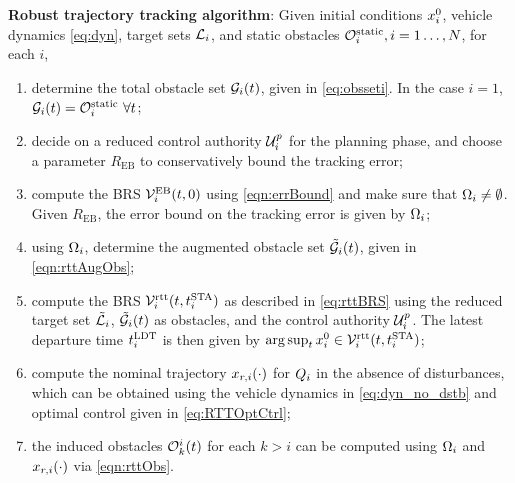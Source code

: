 \begin{alg}
\label{alg:rtt}
\textbf{Robust trajectory tracking algorithm}: Given initial conditions $x_i^0$, vehicle dynamics \eqref{eq:dyn}, target sets $\mathcal{L}_i$, and static obstacles $\mathcal{O}^\text{static}_i, i = 1\ldots, N$, for each $i$,
\begin{enumerate}[leftmargin = 0.5cm]
\item determine the total obstacle set $\mathcal{G}_i(t)$, given in \eqref{eq:obsseti}. In the case $i=1$, $\mathcal{G}_i(t) = \mathcal{O}^\text{static}_i ~ \forall t$;
\item decide on a reduced control authority $\mathcal{U}^p_i$ for the planning phase, and choose a parameter $R_{\text{EB}}$ to conservatively bound the tracking error;
\item compute the BRS $\mathcal{V}^{\text{EB}}_{i}(t, 0)$ using \eqref{eqn:errBound} and make sure that $\Omega_i \neq \emptyset$. Given $R_{\text{EB}}$, the error bound on the tracking error is given by $\Omega_i$;
\item using $\Omega_i$, determine the augmented obstacle set $\tilde{\mathcal{G}}_i(t)$, given in \eqref{eqn:rttAugObs};
\item compute the BRS $\mathcal{V}_i^\text{rtt}(t, t^\text{STA}_i)$ as described in \eqref{eq:rttBRS} using the reduced target set $\tilde{\mathcal{L}}_i$, $\tilde{\mathcal{G}}_i(t)$ as obstacles, and the control authority $\mathcal{U}^p_i$. The latest departure time $t^\text{LDT}_i$ is then given by $\arg \sup_t x^0_i \in \mathcal{V}_i^\text{rtt}(t, t^\text{STA}_i)$;
\item compute the nominal trajectory $x_{r,i}(\cdot)$ for $Q_i$ in the absence of disturbances, which can be obtained using the vehicle dynamics in \eqref{eq:dyn_no_dstb} and optimal control given in \eqref{eq:RTTOptCtrl};
\item the induced obstacles $\mathcal{O}_k^i(t)$ for each $k>i$ can be computed using $\Omega_i$ and $x_{r,i}(\cdot)$ via \eqref{eqn:rttObs}.
\end{enumerate}
\end{alg}